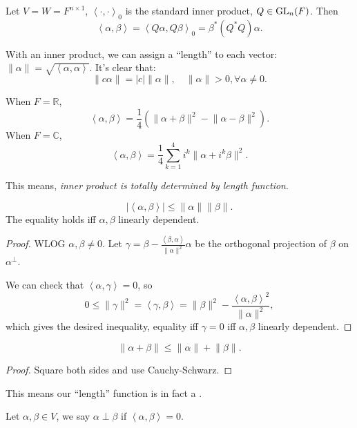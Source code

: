 \begin{example}
    Let $V = W = F^{n\times 1}$, $ \left<\cdot, \cdot \right>_0$ is
	the standard inner product, $Q\in \mathrm{GL}_n(F)$.
	Then
	\[
	\left<\alpha, \beta \right> = \left<Q\alpha, Q\beta \right>_0
	= \beta^*(Q^*Q)\alpha.
	\]
\end{example}

With an inner product, we can assign a ``length''
to each vector: $ \lVert \alpha \rVert = \sqrt{\left<\alpha,\alpha \right>}$.
It's clear that:
\[
\lVert c\alpha \rVert = |c|\lVert \alpha \rVert, \quad
\lVert \alpha \rVert > 0, \forall \alpha \ne 0.
\]

\begin{proposition}
	When $F = \mathbb{R}$,
	\[
	\left<\alpha, \beta \right> = \frac{1}{4}\left(\lVert \alpha + \beta \rVert^2
	- \lVert \alpha - \beta \rVert^2\right).
	\]
	When $F = \mathbb{C}$,
	\[
	\left<\alpha, \beta \right> = \frac{1}{4} \sum_{k=1}^{4} i^k
	\lVert \alpha + i^k \beta \rVert ^2.
	\]
\end{proposition}
\begin{remark}
    This means, \textit{inner product is totally determined by length function}.
\end{remark}

\begin{proposition}
	\[
	|\left<\alpha, \beta \right>| \le \lVert \alpha \rVert \lVert \beta \rVert.
	\]
	The equality holds iff $\alpha, \beta$ linearly dependent.
\end{proposition}
\begin{proof}[Proof]
    WLOG $\alpha, \beta \ne 0$.
	Let $\gamma = \beta -
	\frac{\left<\beta, \alpha \right>}{\lVert \alpha \rVert ^2}\alpha$ be
	the orthogonal projection of $\beta$ on $\alpha^{\perp}$.

	We can check that $ \left<\alpha, \gamma \right> = 0$, so
	\[
	0 \le \lVert \gamma \rVert^2 = \left<\gamma, \beta\right>
	= \lVert \beta \rVert ^2 -
	\frac{\left<\alpha, \beta \right>^2}{\lVert \alpha \rVert ^2},
	\]
	which gives the desired inequality,
	equality iff $\gamma = 0$ iff $\alpha, \beta$ linearly dependent.
\end{proof}

\begin{proposition}
	\[
	\lVert \alpha + \beta \rVert \le \lVert \alpha \rVert + \lVert \beta \rVert.
	\]
\end{proposition}
\begin{proof}[Proof]
    Square both sides and use Cauchy-Schwarz.
\end{proof}

This means our ``length'' function is in fact a .

\begin{definition}[Orthogonality]
	Let $\alpha,\beta\in V$, we say $\alpha \perp \beta$ if
	$\left<\alpha, \beta \right> = 0$.
\end{definition}
